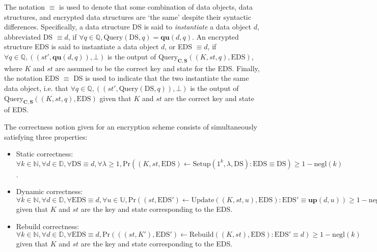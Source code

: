 \documentclass[11pt, pdftex]{article}
\begin{document}
The notation $\equiv$ is used to denote that some combination of data objects, data structures, and encrypted data structures are `the same' despite their syntactic differences. Specifically, a data structure DS is said to {\em instantiate} a data object $d$, abbreviated DS $\equiv d$, if $\forall q \in \mathbb{Q}, \mathrm{Query}(\mathrm{DS},q) = \mathbf{qu}(d,q)$. An encrypted structure EDS is said to instantiate a data object $d$, or EDS $\equiv d$, if $\forall q \in \mathbb{Q}, ((st',\mathbf{qu}(d,q)),\bot)$ is the output of $\mathrm{Query}_{\mathbf{C},\mathbf{S}}((K,st,q),\mathrm{EDS})$, where $K$ and $st$ are assumed to be the correct key and state for the EDS. Finally, the notation EDS $\equiv$ DS is used to indicate that the two instantiate the same data object, i.e. that $\forall q \in \mathbb{Q}, ((st',\mathrm{Query}(\mathrm{DS},q)),\bot)$ is the output of $\mathrm{Query}_{\mathbf{C},\mathbf{S}}((K,st,q),\mathrm{EDS})$ given that $K$ and $st$ are the correct key and state of EDS.

The correctness notion given for an encryption scheme consists of simultaneously satisfying three properties:
\begin{itemize}
	\item Static correctness: $\forall k \in \mathbb{N}, \forall d \in \mathbb{D}, \forall \mathrm{DS} \equiv d, \forall \lambda \ge 1, \mathrm{Pr}((K,st,\mathrm{EDS}) \gets \mathrm{Setup}(1^k, \lambda, \mathrm{DS}) : \mathrm{EDS} \equiv \mathrm{DS}) \ge 1 - \mathrm{negl}(k)$.
	\item Dynamic correctness: $\forall k \in \mathbb{N}, \forall d \in \mathbb{D}, \forall \mathrm{EDS} \equiv d, \forall u \in \mathbb{U}, \mathrm{Pr}((st,\mathrm{EDS}') \gets \mathrm{Update}((K,st,u),\mathrm{EDS}) : \mathrm{EDS}' \equiv \mathbf{up}(d,u)) \ge 1 - \mathrm{negl}(k)$ given that $K$ and $st$ are the key and state corresponding to the EDS.
	\item Rebuild correctness: $\forall k \in \mathbb{N}, \forall d \in \mathbb{D}, \forall \mathrm{EDS} \equiv d, \mathrm{Pr}(((st,K'),\mathrm{EDS}') \gets \mathrm{Rebuild}((K,st),\mathrm{EDS}) : \mathrm{EDS}' \equiv d) \ge 1 - \mathrm{negl}(k)$ given that $K$ and $st$ are the key and state corresponding to the EDS.
\end{itemize}
\end{document}

